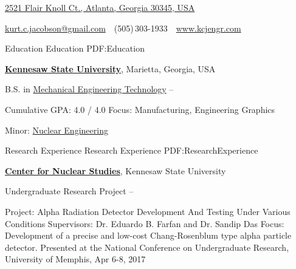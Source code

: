 \documentclass[letterpaper,MMMyyyy,nonstopmode]{resume}
\newcommand{\CVAuthor}{Kurt C. Jacobson}
\newcommand{\CVWebpage}{www.kcjengr.com}
\begin{document}

\Title{\CVAuthor}

\begin{SubTitle}
\href{https://www.google.com/maps/place/2521+Flair+Knoll+Ct+NE,+Atlanta,+GA+30345}
{2521 Flair Knoll Ct., Atlanta, Georgia 30345, USA}
\par
\href{mailto:kurtcjacobson@gmail.com}
{kurt.c.jacobson@gmail.com}
\,\SubBulletSymbol\,
(505)\,303-1933
\,\SubBulletSymbol\,
\href{\CVWebpage}
{\url{\CVWebpage}}
\end{SubTitle}

\begin{Body}


\Section
{Education}
{Education}
{PDF:Education}

\Entry
\href{http://www.kennesaw.edu/}
{\textbf{Kennesaw State University}},
Marietta, Georgia, USA

\Gap
\BulletItem
B.S. in
\href{http://engineering.kennesaw.edu/engineering-technology/}
{Mechanical Engineering Technology}
\hfill
{} --
\begin{Detail}
\SubBulletItem
Cumulative GPA: 4.0 / 4.0
\SubBulletItem
Focus:
Manufacturing, Engineering Graphics

\SubBulletItem
Minor:
\href{http://engineering.kennesaw.edu/nuclear-studies/}
{Nuclear Engineering}
\end{Detail}



\Section
{Research Experience}
{Research Experience}
{PDF:ResearchExperience}

\Entry
\href{http://engineering.kennesaw.edu/nuclear-studies/}
{\textbf{Center for Nuclear Studies}},
Kennesaw State University

\Gap
\BulletItem
Undergraduate Research Project
\hfill
{} --
\begin{Detail}
\SubBulletItem
Project:
Alpha Radiation Detector Development And Testing Under Various Conditions
\SubBulletItem
Supervisors:
Dr. Eduardo B. Farfan and
Dr. Sandip Das
\SubBulletItem
Focus:
Development of a precise and low-cost Chang-Rosenblum type alpha particle detector.
\SubBulletItem
Presented at the National Conference on Undergraduate Research, University of Memphis, Apr 6-8, 2017
\end{Detail}



\end{Body}
\end{document}
